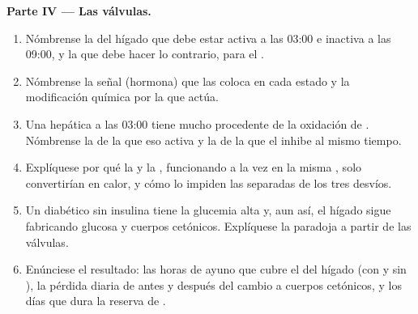 \begin{problem}
\medskip
\noindent\textbf{Parte IV --- Las válvulas.}
\begin{enumerate}[resume]
  \item Nómbrense la  del hígado que debe estar activa a las 03:00 e
        inactiva a las 09:00, y la que debe hacer lo contrario, para el
        .
  \item Nómbrense la señal (hormona) que las coloca en cada estado y la
        modificación química por la que actúa.
  \item Una  hepática a las 03:00 tiene mucho  procedente
        de la oxidación de . Nómbrense la  de la
         que eso activa y la  de la  que el
         inhibe al mismo tiempo.
  \item Explíquese por qué la  y la , funcionando
        a la vez en la misma , solo convertirían  en calor, y cómo
        lo impiden las  separadas de los tres desvíos.
  \item Un diabético sin insulina tiene la glucemia alta y, aun así, el
        hígado sigue fabricando glucosa y cuerpos cetónicos. Explíquese la
        paradoja a partir de las válvulas.
  \item Enúnciese el resultado: las horas de ayuno que cubre el 
        del hígado (con y sin ), la pérdida diaria de
         antes y después del cambio a cuerpos cetónicos, y los días
        que dura la reserva de .
\end{enumerate}
\end{problem}
